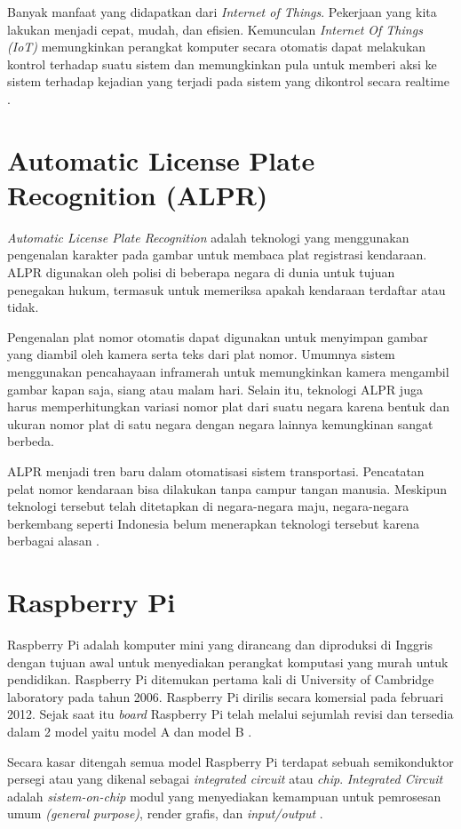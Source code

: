 Banyak manfaat yang didapatkan dari \textit{Internet of Things}. Pekerjaan yang kita lakukan menjadi cepat, mudah, dan efisien. Kemunculan \textit{Internet Of Things} \textit{(IoT)} memungkinkan perangkat komputer secara otomatis dapat melakukan kontrol terhadap suatu sistem dan memungkinkan pula untuk memberi aksi ke sistem terhadap kejadian yang terjadi pada sistem yang dikontrol secara realtime .

\section{Automatic License Plate Recognition (ALPR)}
\textit{Automatic License Plate Recognition} adalah teknologi yang menggunakan pengenalan karakter pada gambar untuk membaca plat registrasi kendaraan. ALPR digunakan oleh polisi di beberapa negara di dunia untuk tujuan penegakan hukum, termasuk untuk memeriksa apakah kendaraan terdaftar atau tidak.

Pengenalan plat nomor otomatis dapat digunakan untuk menyimpan gambar yang diambil oleh kamera serta teks dari plat nomor. Umumnya sistem menggunakan pencahayaan inframerah untuk memungkinkan kamera mengambil gambar kapan saja, siang atau malam hari. Selain itu, teknologi ALPR juga harus memperhitungkan variasi nomor plat dari suatu negara karena bentuk dan ukuran nomor plat di satu negara dengan negara lainnya kemungkinan sangat berbeda.

ALPR menjadi tren baru dalam otomatisasi sistem transportasi. Pencatatan pelat nomor kendaraan bisa dilakukan tanpa campur tangan manusia. Meskipun teknologi tersebut telah ditetapkan di negara-negara maju, negara-negara berkembang seperti Indonesia belum menerapkan teknologi tersebut karena berbagai alasan .

\section{Raspberry Pi}
Raspberry Pi adalah komputer mini yang dirancang dan diproduksi di Inggris dengan tujuan awal untuk menyediakan perangkat komputasi yang murah untuk pendidikan. Raspberry Pi ditemukan pertama kali di University of Cambridge laboratory pada tahun 2006. Raspberry Pi dirilis secara komersial pada februari 2012. Sejak saat itu \textit{board} Raspberry Pi telah melalui sejumlah revisi dan tersedia dalam 2 model yaitu model A dan model B .

Secara kasar ditengah semua model Raspberry Pi terdapat sebuah semikonduktor persegi atau yang dikenal sebagai \textit{integrated circuit} atau \textit{chip}. \textit{Integrated Circuit} adalah \textit{sistem-on-chip} modul yang menyediakan kemampuan untuk pemrosesan umum \textit{(general purpose)}, render grafis, dan \textit{input/output} .


